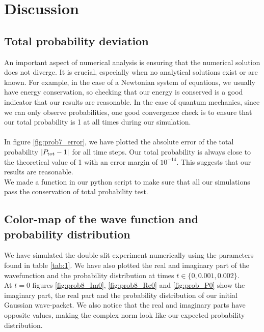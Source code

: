 \documentclass[english,notitlepage,reprint,nofootinbib]{revtex4-2}  %
\begin{document}
	\section{Discussion}\label{sec:discussion}
\subsection{Total probability deviation} \label{subsec:tot_prob_dev}
	\noindent
	An important aspect of numerical analysis is ensuring that the numerical
	solution does not diverge. It is crucial, especially when no
	analytical solutions exist or are known. For example, in the case of a
	Newtonian system of equations, we usually have energy conservation,
	so checking that our energy is conserved is a good indicator that our
	results are reasonable. In the case of quantum mechanics, since we
	can only observe probabilities, one good convergence check is to ensure
	that our total probability is 1 at all times during our simulation. \\
	\noindent \\
	In figure \ref{fig:prob7_error}, we have plotted the absolute error of
	the total probability $|P_{\rm tot} - 1|$ for all time steps.
	Our total probability is always close to the theoretical
	value of 1 with an error margin of $10^{-14}$. This suggests that our results
	are reasonable.\\
	
	\noindent
	We made a function in our python script to make sure that all our
	simulations pass the conservation of total probability test.

	\subsection{Color-map of the wave function and probability distribution}\label{subsec:colormap}
	\noindent
	We have simulated the double-slit experiment numerically using the parameters found in
	table \ref{tab:1}. We have also plotted the real and imaginary part of the wavefunction and the probability
	distribution at times $t \in \{0, 0.001, 0.002 \}$. \\

	\noindent
	At $t=0$ figures \ref{fig:prob8_Im0}, \ref{fig:prob8_Re0} and \ref{fig:prob_P0} show the imaginary part, the real part and the probability distribution
	of our initial Gaussian wave-packet. We also notice that the real and imaginary
	parts have opposite values, making the complex norm look like our expected probability distribution. \\
\end{document}
